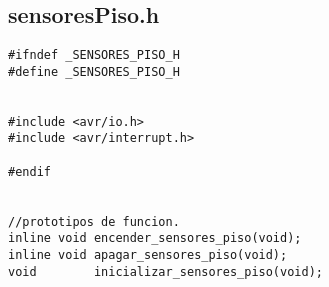 \documentclass[a4paper,12pt]{article}   %
\begin{document}
\subsection{sensoresPiso.h}
\begin{lstlisting}
#ifndef _SENSORES_PISO_H
#define _SENSORES_PISO_H


#include <avr/io.h>
#include <avr/interrupt.h>

#endif


//prototipos de funcion.
inline void encender_sensores_piso(void);
inline void apagar_sensores_piso(void);
void        inicializar_sensores_piso(void);
\end{lstlisting}
\end{document}
